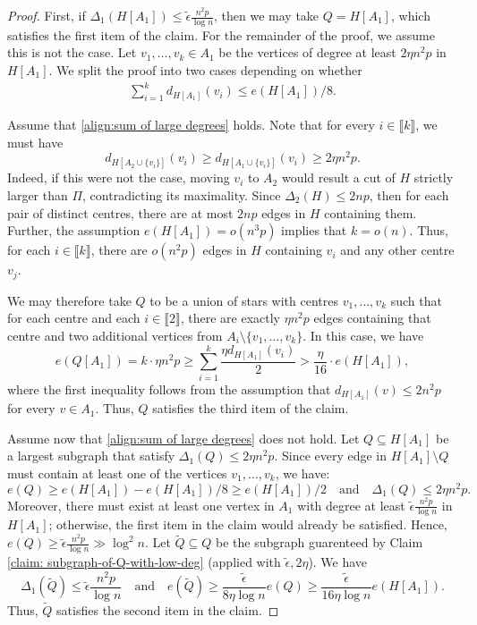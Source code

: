 \documentclass[11pt,a4paper,oneside,reqno]{amsart}
\newcommand{\1}{\mathbbm{1}} %
\newcommand{\br}[1]{\llbracket{#1}\rrbracket}
\renewcommand{\le}{\leqslant}
\renewcommand{\ge}{\geqslant}
\begin{document}
\begin{proof}
    First, if $\Delta_1(H[A_1]) \le \tilde{\epsilon} \frac{n^2 p}{\log n}$, then we may take $Q = H[A_1]$, which satisfies the first item of the claim. For the remainder of the proof, we assume this is not the case. Let $v_1, \dots, v_k \in A_1$ be the vertices of degree at least $2\eta n^2 p$ in $H[A_1]$. We split the proof into two cases depending on whether 
    \begin{align}\label{align:sum of large degrees}
        \sum_{i=1}^{k} d_{H[A_1]}(v_i) \le e(H[A_1])/8.
    \end{align}
     

    Assume that \eqref{align:sum of large degrees} holds. Note that for every $i \in \br{k}$, we must have $$d_{H[A_2 \cup \{v_i\}]}(v_i) \ge d_{H[A_1 \cup \{v_i\}]}(v_i) \ge 2\eta n^2 p.$$ Indeed, if this were not the case, moving $v_i$ to $A_2$ would result a cut of $H$ strictly larger than $\Pi$, contradicting its maximality. Since $\Delta_2(H) \le 2np$, then for each pair of distinct centres, there are at most $2np$ edges in $H$ containing them. Further, the assumption $e(H[A_1]) = o(n^3 p)$ implies that $k = o(n)$. Thus, for each $i \in \br{k}$, there are $o(n^2 p)$ edges in $H$ containing $v_i$ and any other centre $v_j$. 
    
    We may therefore take $Q$ to be a union of stars with centres $v_1, \dots, v_k$ such that for each centre and each $i \in \br{2}$, there are exactly $\eta n^2 p$ edges containing that centre and two additional vertices from $A_i \setminus \{v_1, \dots, v_k\}$. In this case, we have
    \[
        e(Q[A_1]) = k \cdot \eta n^2 p \ge \sum_{i=1}^{k} \frac{\eta d_{H[A_1]}(v_i)}{2} > \frac{\eta}{16} \cdot e(H[A_1]),
    \]    
    where the first inequality follows from the assumption that $d_{H[A_1]}(v) \le 2n^2 p$ for every $v \in A_1$. Thus, $Q$ satisfies the third item of the claim.

    Assume now that \eqref{align:sum of large degrees} does not hold. Let $Q \subseteq H[A_1]$ be a largest subgraph that satisfy $\Delta_1(Q) \le 2 \eta n^2 p$. Since every edge in $H[A_1] \setminus Q$ must contain at least one of the vertices $v_1, \dots, v_k$, we have: 
    \[
        e(Q) \ge e(H[A_1]) - e(H[A_1])/8 \ge e(H[A_1]) / 2 \quad \text{and} \quad \Delta_1(Q) \le 2\eta n^2 p.
    \]
    Moreover, there must exist at least one vertex in $A_1$ with degree at least $\tilde{\epsilon} \frac{n^2 p}{\log n}$ in $H[A_1]$; otherwise, the first item in the claim would already be satisfied. Hence, $e(Q) \ge \tilde{\epsilon} \frac{n^2 p}{\log n} \gg \log^2 n$. Let $\tilde{Q} \subseteq Q$ be the  subgraph guarenteed by Claim \ref{claim: subgraph-of-Q-with-low-deg} (applied with $\tilde{\epsilon}, 2\eta$). We have 
    \[
        \Delta_1(\tilde{Q}) \le \tilde{\epsilon} \frac{n^2 p}{\log n} \quad \text{and} \quad e(\tilde{Q}) \ge \frac{\tilde{\epsilon}}{8 \eta \log n} e(Q) \ge \frac{\tilde{\epsilon}}{16 \eta \log n} e(H[A_1]).
    \]
    Thus, $\tilde{Q}$ satisfies the second item in the claim. 
\end{proof}
\end{document}
